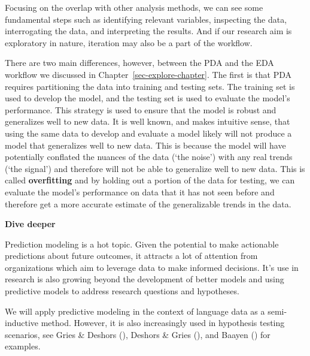 \documentclass[
  letterpaper,
  krantz1]{latex/krantz-mod}
\theoremstyle{definition}
\theoremstyle{definition}
\theoremstyle{remark}
\begin{document}
Focusing on the overlap with other analysis methods, we can see some
fundamental steps such as identifying relevant variables, inspecting the
data, interrogating the data, and interpreting the results. And if our
research aim is exploratory in nature, iteration may also be a part of
the workflow.

There are two main differences, however, between the PDA and the EDA
workflow we discussed in
Chapter~\ref{sec-explore-chapter}.
The first is that PDA requires partitioning the data into training and
testing sets. The training set is used to develop the model, and the
testing set is used to evaluate the model's performance. This strategy
is used to ensure that the model is robust and generalizes well to new
data. It is well known, and makes intuitive sense, that using the same
data to develop and evaluate a model likely will not produce a model
that generalizes well to new data. This is because the model will have
potentially conflated the nuances of the data (`the noise') with any
real trends (`the signal') and therefore will not be able to generalize
well to new data. This is called \textbf{overfitting}
and by holding out a portion of the data for testing, we can evaluate
the model's performance on data that it has not seen before and
therefore get a more accurate estimate of the generalizable trends in
the data.

\begin{tcolorbox}[enhanced jigsaw, toprule=.15mm, breakable, colback=white, arc=.35mm, left=2mm, colframe=quarto-callout-color-frame, opacityback=0, bottomrule=.15mm, rightrule=.15mm, leftrule=.75mm]

\textbf{ Dive deeper}

Prediction modeling is a hot topic. Given the potential to make
actionable predictions about future outcomes, it attracts a lot of
attention from organizations which aim to leverage data to make informed
decisions. It's use in research is also growing beyond the development
of better models and using predictive models to address research
questions and hypotheses.

We will apply predictive modeling in the context of language data as a
semi-inductive method. However, it is also increasingly used in
hypothesis testing scenarios, see Gries \& Deshors
(), Deshors \& Gries
(), and Baayen
() for
examples.

\end{tcolorbox}
\end{document}
